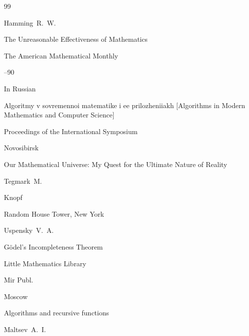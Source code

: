 \begin{thebibliography}{99}

\by Hamming~R.~W.

\paper The Unreasonable Effectiveness of Mathematics

\jour The American Mathematical Monthly




--90





\lang In Russian

\book Algoritmy v sovremennoi matematike i ee prilozheniiakh \rm [Algorithms in Modern Mathematics and Computer Science]

\bookinfo    Proceedings of the International Symposium

\publaddr Novosibirsk








\book Our Mathematical Universe: My Quest for the Ultimate Nature of Reality


\by Tegmark~M.


\publ Knopf

\publaddr Random House Tower, New York






\by Uspensky~V.~A.

\book G\"odel's Incompleteness Theorem 

\serial Little Mathematics Library

\publ Mir Publ.

\publaddr Moscow








\book Algorithms and recursive functions

\by Maltsev~A.~I.


\end{thebibliography}
